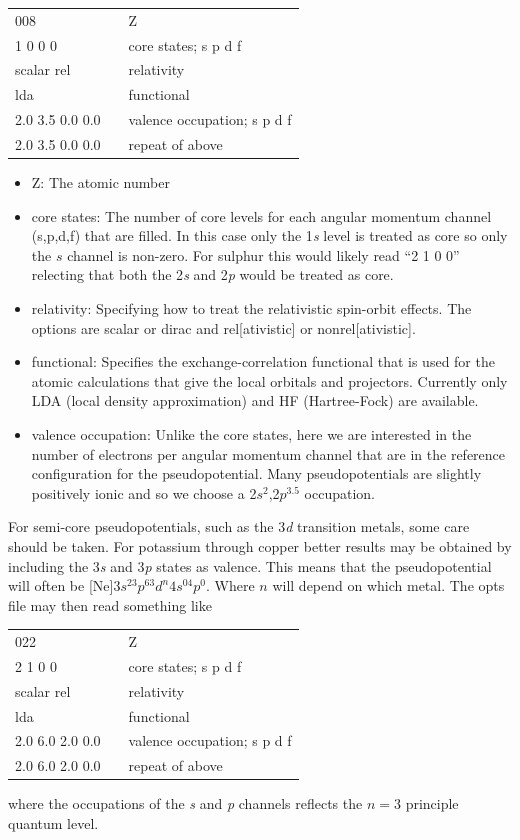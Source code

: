 \documentclass[11pt]{report}
\begin{document}
\begin{center}
\begin{tabular}{| l | c l |}
\hline
008				& &  Z\\
1 0 0 0			& & core states; s p d f \\
scalar rel			& & relativity \\
lda				& & functional \\
2.0 3.5 0.0 0.0		& & valence occupation; s p d f \\
2.0 3.5 0.0 0.0		& & repeat of above \\
\hline
\end{tabular}
\end{center}

\begin{itemize}
\item Z: The atomic number
\item core states: The number of core levels for each angular momentum channel (s,p,d,f) that are filled. In this case only the 1{\it s} level is treated as core so only the $s$ channel is non-zero. For sulphur this would likely read ``2 1 0 0'' relecting that both the 2{\it s} and 2{\it p} would be treated as core.
\item relativity: Specifying how to treat the relativistic spin-orbit effects. The options are scalar or dirac and rel[ativistic] or nonrel[ativistic].
\item functional: Specifies the exchange-correlation functional that is used for the atomic calculations that give the local orbitals and projectors. Currently only LDA (local density approximation) and HF (Hartree-Fock) are available.
\item valence occupation: Unlike the core states, here we are interested in the number of electrons per angular momentum channel that are in the reference configuration for the pseudopotential. Many pseudopotentials are slightly positively ionic and so we choose a 2$s^2$,2$p^{3.5}$ occupation. 
\end{itemize}


For semi-core pseudopotentials, such as the 3{\it d} transition metals, some care should be taken. 
For potassium through copper better results may be obtained by including the 3{\it s} and 3{\it p} states as valence. 
This means that the pseudopotential will often be [Ne]$3s^23p^63d^n4s^04p^0$. 
Where $n$ will depend on which metal. 
The opts file may then read something like 
\begin{center}
\begin{tabular}{| l | c l |}
\hline
022				& &  Z\\
2 1 0 0			& & core states; s p d f \\
scalar rel			& & relativity \\
lda				& & functional \\
2.0 6.0 2.0 0.0		& & valence occupation; s p d f \\
2.0 6.0 2.0 0.0		& & repeat of above \\
\hline
\end{tabular}
\end{center}
where the occupations of the {\it s} and {\it p} channels reflects the $n=3$ principle quantum level.
\end{document}
